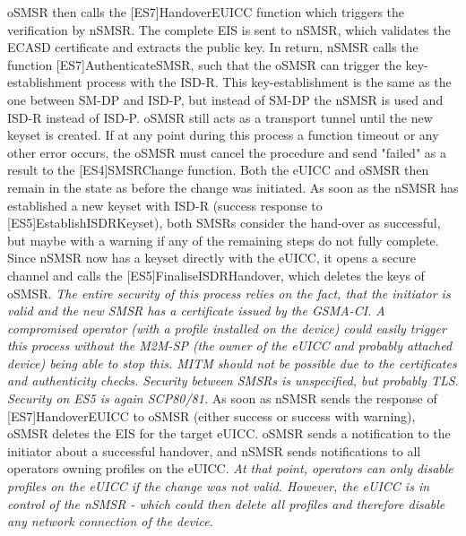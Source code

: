 oSMSR then calls the [ES7]HandoverEUICC function which triggers the verification by nSMSR. The complete EIS is sent to nSMSR, which validates the ECASD certificate and extracts the public key. In return, nSMSR calls the function [ES7]AuthenticateSMSR, such that the oSMSR can trigger the key-establishment process with the ISD-R. This key-establishment is the same as the one between SM-DP and ISD-P, but instead of SM-DP the nSMSR is used and ISD-R instead of ISD-P. oSMSR still acts as a transport tunnel until the new keyset is created. If at any point during this process a function timeout or any other error occurs, the oSMSR must cancel the procedure and send "failed" as a result to the [ES4]SMSRChange function. Both the eUICC and oSMSR then remain in the state as before the change was initiated. As soon as the nSMSR has established a new keyset with ISD-R (success response to [ES5]EstablishISDRKeyset), both SMSRs consider the hand-over as successful, but maybe with a warning if any of the remaining steps do not fully complete. Since nSMSR now has a keyset directly with the eUICC, it opens a secure channel and calls the [ES5]FinaliseISDRHandover, which deletes the keys of oSMSR. \textit{The entire security of this process relies on the fact, that the initiator is valid and the new SMSR has a certificate issued by the GSMA-CI. A compromised operator (with a profile installed on the device) could easily trigger this process without the M2M-SP (the owner of the eUICC and probably attached device) being able to stop this. MITM should not be possible due to the certificates and authenticity checks. Security between SMSRs is unspecified, but probably TLS. Security on ES5 is again SCP80/81.} As soon as nSMSR sends the response of [ES7]HandoverEUICC to oSMSR (either success or success with warning), oSMSR deletes the EIS for the target eUICC. oSMSR sends a notification to the initiator about a successful handover, and nSMSR sends notifications to all operators owning profiles on the eUICC. \textit{At that point, operators can only disable profiles on the eUICC if the change was not valid. However, the eUICC is in control of the nSMSR - which could then delete all profiles and therefore disable any network connection of the device.}

